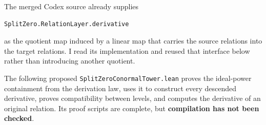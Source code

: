 The merged Codex source already supplies

\begin{verbatim}
SplitZero.RelationLayer.derivative
\end{verbatim}

as the quotient map induced by a linear map that carries the source relations into the target
relations. I read its implementation and reused that interface below rather than introducing another
quotient.

The following proposed \nolinkurl{SplitZeroConormalTower.lean} proves the ideal-power containment from
the derivation law, uses it to construct every descended derivative, proves compatibility between
levels, and computes the derivative of an original relation. Its proof scripts are complete, but
\textbf{compilation has not been checked}.

